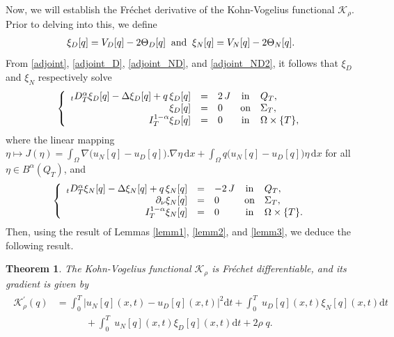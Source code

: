 \documentclass[a4paper,12pt,reqno,natbib]{amsart}
\newtheorem{theorem}{Theorem}
\newcommand{\dx} {\displaystyle\mathrm{d}x}
\newcommand{\dt} {\displaystyle\mathrm{d}t}
\begin{document}
{Now, we will establish the Fr\'echet derivative of the Kohn-Vogelius functional $\mathcal{K}_\rho$. Prior to delving into this, we define
\begin{align*}
   \xi_D[q]= V_D[q] -2 \Theta_D[q] \;\;\hbox{and}\;\; \xi_N[q]= V_N[q] -2 \Theta_N[q].
\end{align*}
From \eqref{adjoint}, \eqref{adjoint_D}, \eqref{adjoint_ND}, and \eqref{adjoint_ND2}, it follows that $\xi_D$ and $\xi_N$ respectively solve%
\begin{eqnarray}  \label{adjoint22}
 \left\{
   \begin{array}{rclcl}
      {}_tD^{\alpha}_T \xi_D[q]-\Delta  \xi_D[q] +q\, \xi_D[q] &=&2\, J & \hbox{in} & Q_T, \\
 \xi_D[q]&=&0 &\hbox{on} & \Sigma_T,\\
 I^{1-\alpha}_{T}\xi_D[q]&=&0 &\hbox{in} & \Omega\times\{T\},
   \end{array}
 \right.
 \end{eqnarray}
where the linear mapping $\eta\longmapsto J(\eta)=\displaystyle\int_{\Omega}
 \nabla \Big(u_N[q]-u_D[q]\Big).\nabla \eta\,\dx+\int_{\Omega}q \Big(u_N[q]-u_D[q]\Big)\eta\, \dx$ for all $\eta\in B^\alpha(Q_T)$, and
\begin{eqnarray}   \label{adjoint222}
 \left\{
   \begin{array}{rclcl}
      {}_tD^{\alpha}_T \xi_N[q]-\Delta  \xi_N[q] +q\, \xi_N[q] &=&-2\, J & \hbox{in} & Q_T, \\
 \partial_\nu \xi_N[q]&=&0 &\hbox{on} & \Sigma_T,\\
 I^{1-\alpha}_{T}\xi_N[q]&=&0 &\hbox{in} & \Omega\times\{T\}.
   \end{array}
 \right.
 \end{eqnarray}
Then, using the result of Lemmas \ref{lemm1}, \ref{lemm2}, and \ref{lemm3}, we deduce the following result.


\begin{theorem}\label{frechlet_K_theorem}
The Kohn-Vogelius functional $\mathcal{K}_\rho$ is Fr\'echet differentiable, and its gradient is given by
\begin{align}
\begin{split}
    \mathcal{K}_\rho^{\prime}(q)&=\int_{0}^T \Big| u_N[q](x,t)-u_D[q](x,t)\Big|^2 \dt +\int_{0}^T \;  u_D[q](x,t) \xi_N[q](x,t)\dt \\
    &\qquad\quad+\int_{0}^T  \; u_N[q](x,t) \xi_D[q](x,t)\dt + 2\rho \;q \label{frechlet_K}.
    \end{split}
\end{align}
\end{theorem}


}
\end{document}
